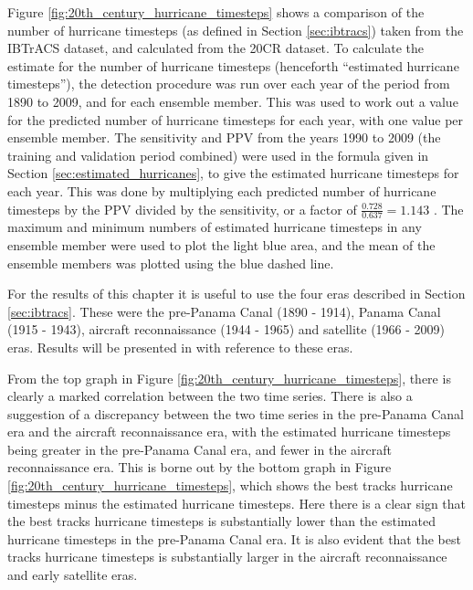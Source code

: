 \documentclass[pdftex,12pt,a4paper]{report}
\begin{document}
Figure \ref{fig:20th_century_hurricane_timesteps} shows a comparison of the number of hurricane
timesteps (as defined in Section \ref{sec:ibtracs}) taken from the IBTrACS dataset, and calculated
from the 20CR dataset. To calculate the estimate for the number of hurricane timesteps (henceforth
``estimated hurricane timesteps''), the detection procedure was run over each year of the period from
1890 to 2009, and for each ensemble member. This was used to work out a value for the predicted
number of hurricane timesteps for each year, with one value per ensemble member. The sensitivity and
PPV from the years 1990 to 2009 (the training and validation period combined) were used in the
formula given in Section \ref{sec:estimated_hurricanes}, to give the estimated hurricane timesteps
for each year. This was done by multiplying each predicted number of hurricane timesteps by the PPV
divided by the sensitivity, or a factor of $\frac{0.728}{0.637} = 1.143$ . The maximum and minimum
numbers of estimated hurricane timesteps in any ensemble member were used to plot the light blue
area, and the mean of the ensemble members was plotted using the blue dashed line.

For the results of this chapter it is useful to use the four eras described in Section
\ref{sec:ibtracs}. These were the pre-Panama Canal (1890 - 1914), Panama Canal (1915 - 1943),
aircraft reconnaissance (1944 - 1965) and satellite (1966 - 2009) eras. Results will be presented in
with reference to these eras.

From the top graph in Figure \ref{fig:20th_century_hurricane_timesteps}, there is clearly a marked
correlation between the two time series. There is also a suggestion of a discrepancy between the two
time series in the pre-Panama Canal era and the aircraft reconnaissance era, with the estimated
hurricane timesteps being greater in the pre-Panama Canal era, and fewer in the
aircraft reconnaissance era. This is borne out by the bottom graph in Figure 
\ref{fig:20th_century_hurricane_timesteps}, which shows the best tracks hurricane timesteps minus the
estimated hurricane timesteps. Here there is a clear sign that the best tracks hurricane timesteps
is substantially lower than the estimated hurricane timesteps in the pre-Panama Canal era. It is
also evident that the best tracks hurricane timesteps is substantially larger in the aircraft
reconnaissance and early satellite eras.
\end{document}

